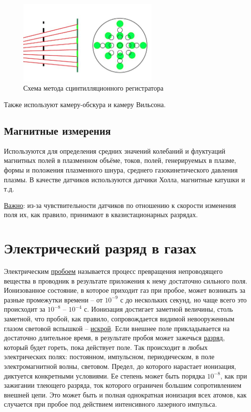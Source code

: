 \documentclass[10pt, a4paper]{article}
\let\stdsection\section
\renewcommand\section{\newpage\stdsection}
\begin{document}
\begin{figure}[ht]
	\begin{center}
		\includegraphics[width=70mm]{scintelator.JPG}
	\end{center}
	\caption{Схема метода сцинтилляционного регистратора}
	\label{fig:scintillator}
\end{figure}

Также используют камеру-обскура и камеру Вильсона.

\subsection{Магнитные измерения}

Используются для определения средних значений колебаний и флуктуаций магнитных полей в плазменном объёме, токов, полей, генерируемых в плазме, формы и положения плазменного шнура, среднего газокинетического давления плазмы. В качестве датчиков используются датчики Холла, магнитные катушки и т.д. 

\uline{Важно}: из-за чувствительности датчиков по отношению к скорости изменения поля их, как правило, принимают в квазистационарных разрядах.

\section{Электрический разряд в газах}

Электрическим \uline{пробоем} называется процесс превращения непроводящего вещества в проводник в результате приложения к нему достаточно сильного поля. Ионизованное состояние, в которое приходит газ при пробое, может возникать за разные промежутки времени -- от $10^{-9}$ с до нескольких секунд, но чаще всего это происходит за $10^{-8}$ -- $10^{-4}$ с. Ионизация достигает заметной величины, столь заметной, что пробой, как правило, сопровождается видимой невооруженным глазом световой вспышкой -- \uline{искрой}. Если внешнее поле прикладывается на достаточно длительное время, в результате пробоя может зажечься \uline{разряд}, который будет гореть, пока действует поле. Так происходит в любых электрических полях: постоянном, импульсном, периодическом, в поле электромагнитной волны, световом. Предел, до которого нарастает ионизация, диктуется конкретными условиями. Ее степень может быть порядка $10^{-8}$, как при зажигании тлеющего разряда, ток которого ограничен большим сопротивлением внешней цепи. Это может быть и полная однократная ионизация всех атомов, как случается при пробое под действием интенсивного лазерного импульса.
\end{document}

